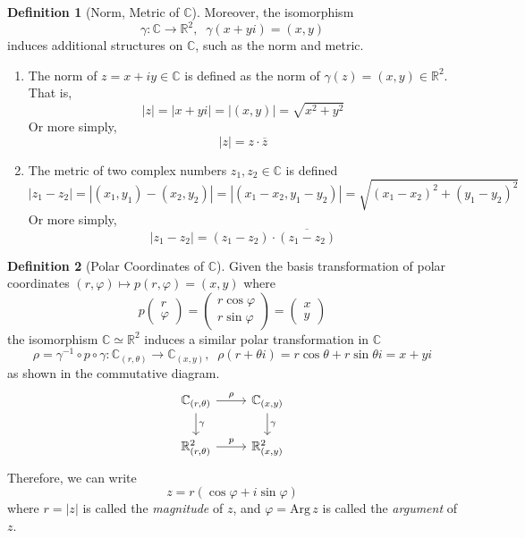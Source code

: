 \documentclass{article}
\theoremstyle{remark}
\theoremstyle{definition}
\newtheorem{definition}{Definition}[section]
\begin{document}
\begin{definition}[Norm, Metric of $\mathbb{C}$]
Moreover, the isomorphism
\[\gamma: \mathbb{C} \longrightarrow \mathbb{R}^2, \;\; \gamma(x + yi) = (x, y)\]
induces additional structures on $\mathbb{C}$, such as the norm and metric. 
\begin{enumerate}
    \item The norm of $z = x + iy \in \mathbb{C}$ is defined as the norm of $\gamma(z) = (x, y) \in \mathbb{R}^2$. That is, 
    \[|z| = |x + yi| = |(x, y)| = \sqrt{x^2 + y^2}\]
    Or more simply, 
    \[|z| = z \cdot \overline{z}\]
    \item The metric of two complex numbers $z_1, z_2 \in \mathbb{C}$ is defined
    \[|z_1 - z_2| = |(x_1, y_1) - (x_2, y_2)| = |(x_1 - x_2, y_1 - y_2)| = \sqrt{(x_1 - x_2)^2 + (y_1 - y_2)^2}\]
    Or more simply, 
    \[|z_1 - z_2| = (z_1 - z_2) \cdot \overline{(z_1 - z_2)}\]
\end{enumerate}
\end{definition}

\begin{definition}[Polar Coordinates of $\mathbb{C}$]
Given the basis transformation of polar coordinates $(r, \varphi) \mapsto p(r, \varphi) = (x, y)$ where 
\[p\begin{pmatrix} r \\ \varphi \end{pmatrix} = \begin{pmatrix}
r \cos{\varphi} \\ r \sin{\varphi} 
\end{pmatrix} = \begin{pmatrix} x \\ y \end{pmatrix}\]
the isomorphism $\mathbb{C} \simeq \mathbb{R}^2$ induces a similar polar transformation in $\mathbb{C}$
\[\rho = \gamma^{-1} \circ p \circ \gamma: \mathbb{C}_{(r, \theta)} \longrightarrow \mathbb{C}_{(x, y)}, \;\;\rho(r + \theta i) = r \cos{\theta} + r \sin{\theta} i = x + y i\]
as shown in the commutative diagram. 
\[\begin{tikzcd}
    \mathbb{C}_{(r, \theta)} \arrow{d}{\gamma} \arrow{r}{\rho} & \mathbb{C}_{(x, y)} \arrow{d}{\gamma} \\
    \mathbb{R}^2_{(r, \theta)} \arrow{r}{p} & \mathbb{R}^2_{(x, y)}
  \end{tikzcd}\]
Therefore, we can write 
\[z = r ( \cos{\varphi} + i \sin{\varphi})\]
where $r = |z|$ is called the \textit{magnitude} of $z$, and $\varphi = \text{Arg}\,z$ is called the \textit{argument} of $z$. 
\end{definition}
\end{document}

